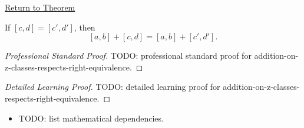 \newpage
{}
\label{prf:addition-on-z-classes-respects-right-equivalence}

\begin{remark*}[Return]
\hyperref[lem:addition-on-z-classes-respects-right-equivalence]{Return to Theorem}
\end{remark*}

\begin{lemma*}
If $[c,d]=[c',d']$, then
\[
[a,b]+[c,d]=[a,b]+[c',d'].
\]
\end{lemma*}

\begin{proof}[Professional Standard Proof]
\LRAProofBodyStart
TODO: professional standard proof for addition-on-z-classes-respects-right-equivalence.
\end{proof}

\begin{proof}[Detailed Learning Proof]
\LRAProofBodyStart
TODO: detailed learning proof for addition-on-z-classes-respects-right-equivalence.
\end{proof}

\begin{remark*}
\end{remark*}

\begin{dependencies}
\begin{itemize}
  \item TODO: list mathematical dependencies.
\end{itemize}
\end{dependencies}

\clearpage
